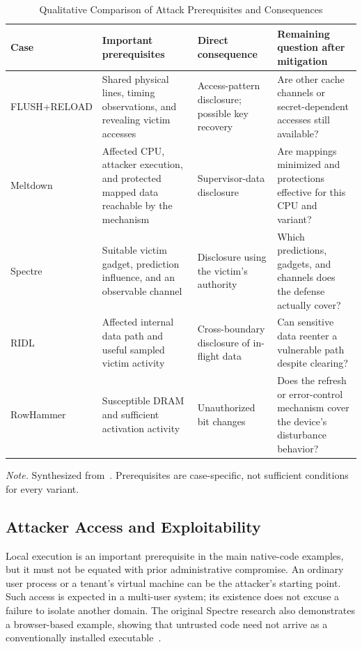 \documentclass[man,12pt,apacite,nofontenc,nolmodern,floatsintext]{apa6}
\begin{document}
\begin{table}[htbp]
\centering
\caption{Qualitative Comparison of Attack Prerequisites and Consequences}\label{tab:risk}
\small
\renewcommand{\baselinestretch}{1}\selectfont
\begin{tabularx}{\textwidth}{@{}>{\raggedright\arraybackslash}p{}*{3}{>{\raggedright\arraybackslash}X}@{}}
\toprule
Case & Important prerequisites & Direct consequence & Remaining question after mitigation \\
\midrule
FLUSH+RELOAD & Shared physical lines, timing observations, and revealing victim accesses & Access-pattern disclosure; possible key recovery & Are other cache channels or secret-dependent accesses still available? \\
\addlinespace
Meltdown & Affected CPU, attacker execution, and protected mapped data reachable by the mechanism & Supervisor-data disclosure & Are mappings minimized and protections effective for this CPU and variant? \\
\addlinespace
Spectre & Suitable victim gadget, prediction influence, and an observable channel & Disclosure using the victim's authority & Which predictions, gadgets, and channels does the defense actually cover? \\
\addlinespace
RIDL & Affected internal data path and useful sampled victim activity & Cross-boundary disclosure of in-flight data & Can sensitive data reenter a vulnerable path despite clearing? \\
\addlinespace
RowHammer & Susceptible DRAM and sufficient activation activity & Unauthorized bit changes & Does the refresh or error-control mechanism cover the device's disturbance behavior? \\
\bottomrule
\end{tabularx}
\begin{flushleft}
\textit{Note.} Synthesized from~\cite{kim2014,spectre2019,meltdown2018,ridl2019,yarom2014}. Prerequisites are case-specific, not sufficient conditions for every variant.
\end{flushleft}
\end{table}

\subsection{Attacker Access and Exploitability}
Local execution is an important prerequisite in the main native-code examples, but it must not be equated with prior administrative compromise. An ordinary user process or a tenant's virtual machine can be the attacker's starting point. Such access is expected in a multi-user system; its existence does not excuse a failure to isolate another domain. The original Spectre research also demonstrates a browser-based example, showing that untrusted code need not arrive as a conventionally installed executable~\cite{spectre2019}.
\end{document}
